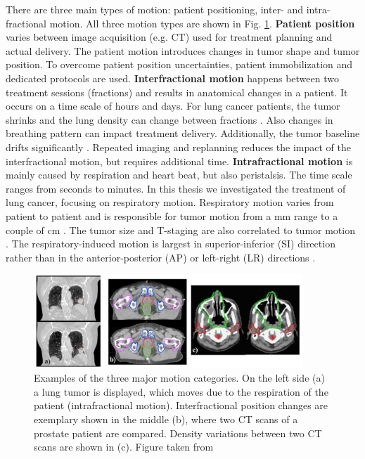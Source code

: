 There are three main types of motion: patient positioning, inter- and intra-fractional motion. All three motion types are shown in Fig. \ref{motion}.
\newline
\textbf{Patient position} varies between image acquisition (e.g. CT) used for treatment planning and actual delivery. The patient motion introduces changes in tumor shape and tumor position. To overcome patient 
position uncertainties, patient immobilization and dedicated protocols are used.
\newline
\textbf{Interfractional motion} happens between two treatment sessions (fractions) and results in anatomical changes in a patient. It occurs on a time scale of hours and days. For lung cancer patients, the 
tumor shrinks and the lung density can change between fractions \cite{Mori2009}. 
Also changes in breathing pattern can impact treatment delivery. Additionally, the tumor baseline drifts significantly \cite{Sonke2008}. Repeated imaging and replanning reduces the impact of the interfractional motion, but requires additional time.
\newline
\textbf{Intrafractional motion} is mainly caused by respiration and heart beat, but also peristalsis. The time scale ranges from seconds to minutes. In this thesis we investigated the treatment of lung cancer, focusing on respiratory motion. Respiratory motion varies from patient to patient and 
is responsible for tumor motion from a mm range to a couple of cm \cite{Shirato2004a}. The tumor size and T-staging are also correlated to tumor motion \cite{Liu2007}. The respiratory-induced motion is largest in superior-inferior (SI) direction rather than 
in the anterior-posterior (AP) or left-right (LR) directions \cite{Seppenwoolde2002, Britton2007, Liu2007}.

\newpage

\begin{figure}[H]
\begin{center}
\includegraphics[width=0.9\textwidth]{./Fundamentals/Images/motion_examples.png}
\caption{Examples of the three major motion categories. On the left side (a) a lung tumor is displayed, which moves due to the respiration 
of the patient (intrafractional motion). Interfractional position changes are exemplary shown in the middle (b), where two CT scans of a 
prostate patient are compared. Density variations between two CT scans are shown in (c). Figure taken from \cite{Engelsman2011}}
\label{motion}
\end{center}
\end{figure}

